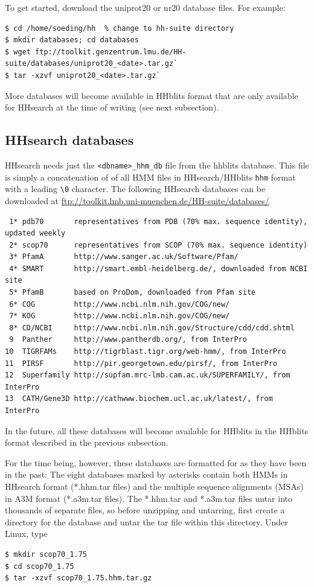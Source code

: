 \documentclass[11pt,a4paper]{article}
\begin{document}
To get started, download the uniprot20 or nr20 database files. For example:
\begin{verbatim}
$ cd /home/soeding/hh  % change to hh-suite directory
$ mkdir databases; cd databases
$ wget ftp://toolkit.genzentrum.lmu.de/HH-suite/databases/uniprot20_<date>.tar.gz`
$ tar -xzvf uniprot20_<date>.tar.gz`
\end{verbatim}

More databases will become available in HHblits format that are only available for HHsearch at the time of writing (see next subsection).

\subsection{HHsearch databases} \label{hhsearch_dbs}
HHsearch needs just the \verb`<dbname>_hhm_db` file from the hhblits database. This file is simply a concatenation of of all HMM files in HHsearch/HHblits \verb`hhm` format with a leading \verb`\0` character. The following HHsearch databases can be downloaded at \url{ftp://toolkit.lmb.uni-muenchen.de/HH-suite/databases/}

\small 
\begin{verbatim}
 1* pdb70       representatives from PDB (70% max. sequence identity), updated weekly
 2* scop70      representatives from SCOP (70% max. sequence identity)
 3* PfamA       http://www.sanger.ac.uk/Software/Pfam/
 4* SMART       http://smart.embl-heidelberg.de/, downloaded from NCBI site
 5* PfamB       based on ProDom, downloaded from Pfam site
 6* COG         http://www.ncbi.nlm.nih.gov/COG/new/
 7* KOG	        http://www.ncbi.nlm.nih.gov/COG/new/
 8* CD/NCBI     http://www.ncbi.nlm.nih.gov/Structure/cdd/cdd.shtml
 9  Panther     http://www.pantherdb.org/, from InterPro
10  TIGRFAMs    http://tigrblast.tigr.org/web-hmm/, from InterPro
11  PIRSF       http://pir.georgetown.edu/pirsf/, from InterPro
12  Superfamily http://supfam.mrc-lmb.cam.ac.uk/SUPERFAMILY/, from InterPro
13  CATH/Gene3D http://cathwww.biochem.ucl.ac.uk/latest/, from InterPro 
\end{verbatim} 
\normalsize
In the future, all these databases will become available for HHblits in the HHblits format described in the previous subsection.

For the time being, however, these databases are formatted for as they have been in the past:
The eight databases marked by asterisks contain both HMMs in HHsearch 
format (*.hhm.tar files) and the multiple sequence alignments (MSAs) in 
A3M format (*.a3m.tar files).  The *.hhm.tar and *.a3m.tar files untar into thousands
of separate files, so before unzipping and untarring, first create a directory for 
the database and untar the tar file within this directory. Under Linux, type
\begin{verbatim}
$ mkdir scop70_1.75
$ cd scop70_1.75
$ tar -xzvf scop70_1.75.hhm.tar.gz
\end{verbatim}
\end{document}
